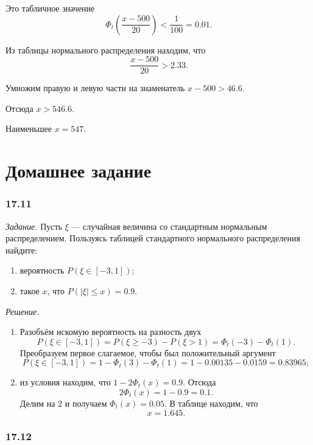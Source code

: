Это табличное значение
$$ \Phi_t \left( \frac{x - 500}{20} \right) <
  \frac{1}{100} =
  0.01.$$

Из таблицы нормального распределения находим, что
$$ \frac{x - 500}{20} >
  2.33.$$

Умножим правую и левую части на знаменатель $x - 500 > 46.6$.

Отсюда $x > 546.6.$

Наименьшее $x = 547$.

\section*{Домашнее задание}

\subsubsection*{17.11}

\textit{Задание.} Пусть $ \xi $ --- случайная величина со стандартным нормальным распределением.
Пользуясь таблицей стандартного нормального распределения найдите:
\begin{enumerate}[label=\alph*)]
\item вероятность $P \left( \xi \in \left[ -3, 1 \right] \right) $;
\item такое $x$, что $P \left( \left| \xi \right| \leq x \right) = 0.9$.
\end{enumerate}

\textit{Решение.}
\begin{enumerate}[label=\alph*)]
\item Разобъём искомую вероятность на разность двух
$$P \left( \xi \in \left[ -3, 1 \right] \right) =
  P \left( \xi \geq -3 \right) - P \left( \xi > 1 \right) =
  \Phi_t \left( -3 \right) - \Phi_t \left( 1 \right).$$
Преобразуем первое слагаемое, чтобы был положительный аргумент
$$P \left( \xi \in \left[ -3, 1 \right] \right) =
  1 - \Phi_t \left( 3 \right) - \Phi_t \left( 1 \right) =
  1 - 0.00135 - 0.0159 =
  0.83965;$$
\item из условия находим, что $1 - 2 \Phi_t \left( x \right) = 0.9$.
Отсюда
$$2 \Phi_t \left( x \right) =
  1 - 0.9 =
  0.1.$$
Делим на $2$ и получаем $ \Phi_t \left( x \right) = 0.05$.
В таблице находим, что
$$x =
  1.645.$$
\end{enumerate}

\subsubsection*{17.12}

